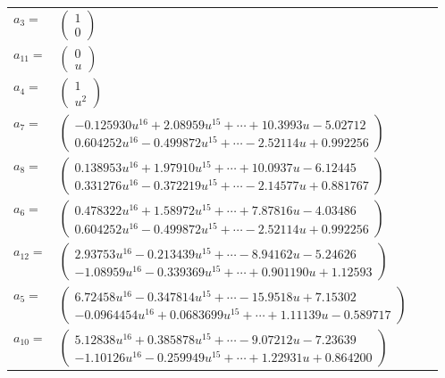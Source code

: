 \documentclass[1p]{elsarticle_modified}
\theoremstyle{definition}
\begin{document}
\begin{tabular}{m{7pt} m{180pt} m{7pt} m{180pt} }
\flushright $a_{3}=$&$\begin{pmatrix}1\\0\end{pmatrix}$ \\
\flushright $a_{11}=$&$\begin{pmatrix}0\\u\end{pmatrix}$ \\
\flushright $a_{4}=$&$\begin{pmatrix}1\\u^2\end{pmatrix}$ \\
\flushright $a_{7}=$&$\begin{pmatrix}-0.125930 u^{16}+2.08959 u^{15}+\cdots+10.3993 u-5.02712\\0.604252 u^{16}-0.499872 u^{15}+\cdots-2.52114 u+0.992256\end{pmatrix}$ \\
\flushright $a_{8}=$&$\begin{pmatrix}0.138953 u^{16}+1.97910 u^{15}+\cdots+10.0937 u-6.12445\\0.331276 u^{16}-0.372219 u^{15}+\cdots-2.14577 u+0.881767\end{pmatrix}$ \\
\flushright $a_{6}=$&$\begin{pmatrix}0.478322 u^{16}+1.58972 u^{15}+\cdots+7.87816 u-4.03486\\0.604252 u^{16}-0.499872 u^{15}+\cdots-2.52114 u+0.992256\end{pmatrix}$ \\
\flushright $a_{12}=$&$\begin{pmatrix}2.93753 u^{16}-0.213439 u^{15}+\cdots-8.94162 u-5.24626\\-1.08959 u^{16}-0.339369 u^{15}+\cdots+0.901190 u+1.12593\end{pmatrix}$ \\
\flushright $a_{5}=$&$\begin{pmatrix}6.72458 u^{16}-0.347814 u^{15}+\cdots-15.9518 u+7.15302\\-0.0964454 u^{16}+0.0683699 u^{15}+\cdots+1.11139 u-0.589717\end{pmatrix}$ \\
\flushright $a_{10}=$&$\begin{pmatrix}5.12838 u^{16}+0.385878 u^{15}+\cdots-9.07212 u-7.23639\\-1.10126 u^{16}-0.259949 u^{15}+\cdots+1.22931 u+0.864200\end{pmatrix}$ \\

\end{tabular}
\end{document}
